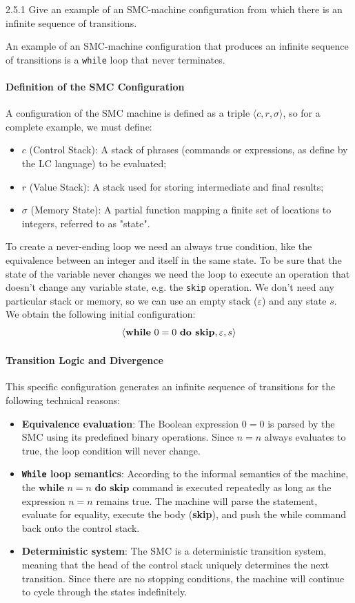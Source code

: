 \begin{exercise}{2.5.1}
Give an example of an SMC-machine configuration from which there is an infinite sequence of transitions.
\end{exercise}
\begin{solution}
An example of an SMC-machine configuration that produces an infinite sequence of transitions is a \texttt{while} loop that never terminates.
\paragraph{Definition of the SMC Configuration}
A configuration of the SMC machine is defined as a triple $\langle c,r,\sigma \rangle$, so for a complete example, we must define:
\begin{itemize}
\item $c$ (Control Stack): A stack of phrases (commands or expressions, as define by the {\sffamily LC} language) to be evaluated;
\item $r$ (Value Stack): A stack used for storing intermediate and final results;
\item $\sigma$ (Memory State): A partial function mapping a finite set of locations to integers, referred to as "state".
\end{itemize}

To create a never-ending loop we need an always true condition, like the equivalence between an integer and itself in the same state. To be sure that the state of the variable never changes we need the loop to execute an operation that doesn't change any variable state, e.g. the \texttt{skip} operation. We don't need any particular stack or memory, so we can use an empty stack ($\varepsilon$) and any state $s$. 
We obtain the following initial configuration:
\[ \langle \text{\textbf{while} }0=0 \text{ \textbf{do skip}}, \varepsilon, s \rangle \]
\paragraph{Transition Logic and Divergence}
This specific configuration generates an infinite sequence of transitions for the following technical reasons:
\begin{itemize}
\item \textbf{Equivalence evaluation}: The Boolean expression $0=0$ is parsed by the SMC using its predefined binary operations. Since $n=n$ always evaluates to true, the loop condition will never change. 
\item \textbf{\texttt{While} loop semantics}: According to the informal semantics of the machine, the $\textbf{while } n=n \textbf{ do skip}$ command is executed repeatedly as long as the expression $n=n$ remains true. The machine will parse the statement, evaluate for equality, execute the body (\textbf{skip}), and push the while command back onto the control stack.
\item \textbf{Deterministic system}: The SMC is a deterministic transition system, meaning that the head of the control stack uniquely determines the next transition. Since there are no stopping conditions, the machine will continue to cycle through the states indefinitely.
\end{itemize}

\end{solution}
